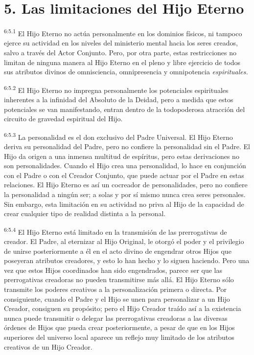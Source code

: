 \section*{5. Las limitaciones del Hijo Eterno}
\par
\textsuperscript{6:5.1} El Hijo Eterno no actúa personalmente en los dominios físicos, ni tampoco ejerce su actividad en los niveles del ministerio mental hacia los seres creados, salvo a través del Actor Conjunto. Pero, por otra parte, estas restricciones no limitan de ninguna manera al Hijo Eterno en el pleno y libre ejercicio de todos sus atributos divinos de omnisciencia, omnipresencia y omnipotencia \textit{espirituales.}

\par
\textsuperscript{6:5.2} El Hijo Eterno no impregna personalmente los potenciales espirituales inherentes a la infinidad del Absoluto de la Deidad, pero a medida que estos potenciales se van manifestando, entran dentro de la todopoderosa atracción del circuito de gravedad espiritual del Hijo.

\par
\textsuperscript{6:5.3} La personalidad es el don exclusivo del Padre Universal. El Hijo Eterno deriva su personalidad del Padre, pero no confiere la personalidad sin el Padre. El Hijo da origen a una inmensa multitud de espíritus, pero estas derivaciones no son personalidades. Cuando el Hijo crea una personalidad, lo hace en conjunción con el Padre o con el Creador Conjunto, que puede actuar por el Padre en estas relaciones. El Hijo Eterno es así un cocreador de personalidades, pero no confiere la personalidad a ningún ser; a solas y por sí mismo nunca crea seres personales. Sin embargo, esta limitación en su actividad no priva al Hijo de la capacidad de crear cualquier tipo de realidad distinta a la personal.

\par
\textsuperscript{6:5.4} El Hijo Eterno está limitado en la transmisión de las prerrogativas de creador. El Padre, al eternizar al Hijo Original, le otorgó el poder y el privilegio de unirse posteriormente a él en el acto divino de engendrar otros Hijos que poseyeran atributos creadores, y esto lo han hecho y lo siguen haciendo. Pero una vez que estos Hijos coordinados han sido engendrados, parece ser que las prerrogativas creadoras no pueden transmitirse más allá. El Hijo Eterno sólo transmite los poderes creativos a la personalización primera o directa. Por consiguiente, cuando el Padre y el Hijo se unen para personalizar a un Hijo Creador, consiguen su propósito; pero el Hijo Creador traído así a la existencia nunca puede transmitir o delegar las prerrogativas creadoras a las diversas órdenes de Hijos que pueda crear posteriormente, a pesar de que en los Hijos superiores del universo local aparece un reflejo muy limitado de los atributos creativos de un Hijo Creador.

